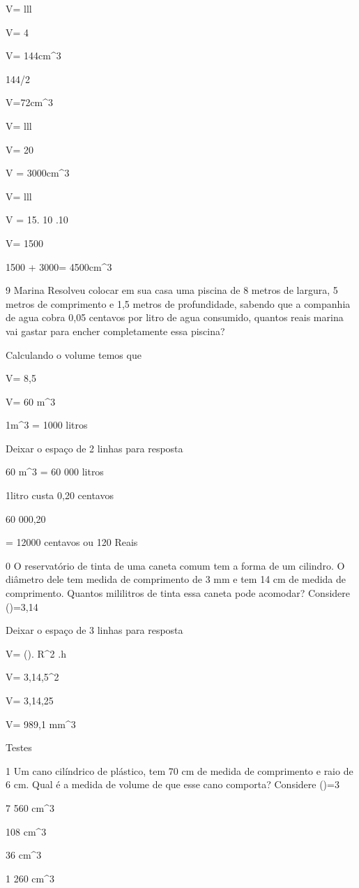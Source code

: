 V= l\times l\times l

V= 4

V= 144cm^3

144/2

V=72cm^3

\item 

V= l\times l\times l

V= 20

V = 3000cm^3

V= l\times l\times l

V = 15. 10 .10

V= 1500

1500 + 3000= 4500cm^3

\num{9} Marina Resolveu colocar em sua casa uma piscina de 8 metros de
largura, 5 metros de comprimento e 1,5 metros de profundidade, sabendo
que a companhia de agua cobra 0,05 centavos por litro de agua consumido,
quantos reais marina vai gastar para encher completamente essa piscina?

Calculando o volume temos que

V= 8,5

V= 60 m^3

1m^3 = 1000 litros

Deixar o espaço de 2 linhas para resposta

60 m^3 = 60 000 litros

1litro custa 0,20 centavos

60 000,20

= 12000 centavos ou 120 Reais

\num{0} O reservatório de tinta de uma caneta comum tem a forma de um
cilindro. O diâmetro dele tem medida de comprimento de 3 mm e tem 14 cm
de medida de comprimento. Quantos mililitros de tinta essa caneta pode
acomodar? Considere (\Pi)=3,14

Deixar o espaço de 3 linhas para resposta

V= (\Pi). R^2 .h

V= 3,14,5^2

V= 3,14,25

V= 989,1 mm^3

Testes

\num{1} Um cano cilíndrico de plástico, tem 70 cm de medida de comprimento e
raio de 6 cm. Qual é a medida de volume de que esse cano comporta?
Considere (\Pi)=3

\item 7 560 cm^3
\item 108 cm^3
\item 36 cm^3
\item 1 260 cm^3

